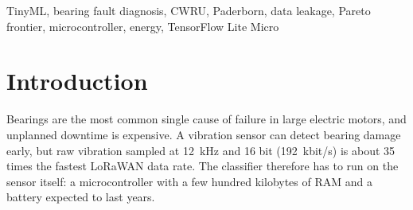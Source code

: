 \documentclass[conference]{IEEEtran}
\begin{document}
\begin{abstract}
(R4), which raises the best bearing-disjoint macro-F1 to \NumPThreeRFourBest{}. A simulated measurement campaign that
runs synthetic INA219 samples through the logger's own integration code predicts a session-to-session CV of
\NumVrigCvMedian{} and about \NumVrigHours{} hours of board time. Because the front end sets the cost, we then cut
it in two ways. A fixed-point R1 front end on integer sensor samples needs \NumFxMfROneSave{} fewer cycles than the
float one on the Cortex-M4F with unchanged predictions, and q15 front ends are \NumFxNofpuRFourSpeedQ{}--\NumFxNofpuROneSpeedQ{}$\times$
faster on a core without an FPU. A detect-then-diagnose cascade, whose always-on gate uses only those integer
features, lowers the energy per window of the most accurate unseen-bearing model from \NumCasBestESingle{} to
\NumCasBestEOne{}\,$\mu$J at 1\,\% fault prevalence, for a mean macro-F1 change of \NumCasPThreeEitherDFOne{}. A second
data set with real damage, Paderborn (32 physical bearings, \NumPuResults{} further runs), confirms the leakage
collapse (best macro-F1 \NumPuPOneBest{} leaky, \NumPuPThreeBest{} on unseen bearings, \NumPuPFourBest{} from
artificial to real damage) and that the envelope front end is the best input for unseen bearings, but the model
ranking does not transfer between the data sets (Kendall $\tau$ = \NumPuTauCwruPThree{}) and the cheap gate finds no
operating point that saves energy without losing faults. Energies here are chip-level estimates; INA219
measurements replace them in the final version.
\end{abstract}

\begin{IEEEkeywords}
TinyML, bearing fault diagnosis, CWRU, Paderborn, data leakage, Pareto frontier, microcontroller, energy, TensorFlow Lite Micro
\end{IEEEkeywords}

\section{Introduction}
Bearings are the most common single cause of failure in large electric motors, and unplanned downtime is expensive.
A vibration sensor can detect bearing damage early, but raw vibration sampled at \SI{12}{kHz} and 16 bit
(\SI{192}{kbit/s}) is about 35 times the fastest LoRaWAN data rate. The classifier therefore has to run on the sensor
itself: a microcontroller with a few hundred kilobytes of RAM and a battery expected to last years.
\end{document}
